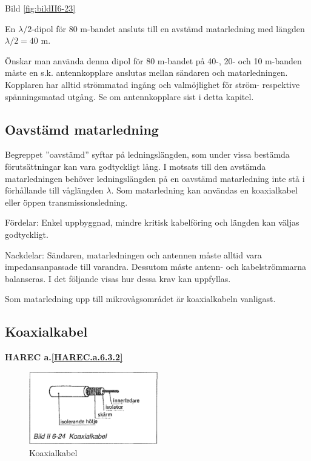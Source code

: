 Bild \ref{fig:bildII6-23}

En \(\lambda/2\)-dipol för 80 m-bandet ansluts till en avstämd
matarledning med längden \(\lambda/2 = 40\) m.

Önskar man använda denna dipol för 80 m-bandet på 40-, 20- och 10
m-banden måste en s.k. antennkopplare anslutas mellan sändaren och
matarledningen. Kopplaren har alltid strömmatad ingång och
valmöjlighet för ström- respektive spänningsmatad utgång. Se om
antennkopplare sist i detta kapitel.

\subsection{Oavstämd matarledning}

Begreppet ''oavstämd'' syftar på ledningslängden, som under vissa
bestämda förutsättningar kan vara godtyckligt lång. I motsats till den
avstämda matarledningen behöver ledningslängden på en oavstämd
matarledning inte stå i förhållande till våglängden \(\lambda\). Som
matarledning kan användas en koaxialkabel eller öppen
transmissionsledning.

Fördelar: Enkel uppbyggnad, mindre kritisk kabelföring och längden kan
väljas godtyckligt.

Nackdelar: Sändaren, matarledningen och antennen måste alltid vara
impedansanpassade till varandra. Dessutom måste antenn- och
kabelströmmarna balanseras. I det följande visas hur dessa krav kan
uppfyllas.

Som matarledning upp till mikrovågsområdet är koaxialkabeln vanligast.

\subsection{Koaxialkabel}
\textbf{
HAREC a.\ref{HAREC.a.6.3.2}\label{myHAREC.a.6.3.2}
}

\begin{figure}
  \includegraphics[width=0.5\textwidth]{images/bild_2_6-24}
  \caption{Koaxialkabel}
  \label{fig:bildII6-24}
\end{figure}

